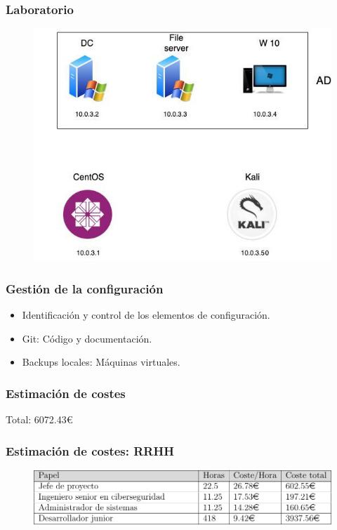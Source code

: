\documentclass[a4paper,10pt]{beamer}
\newcommand{\linej}{\hfill\break}
\begin{document}
\begin{frame}[fragile]
	\frametitle{Laboratorio}

	\begin{figure}[H]
		\centering
		\includegraphics[width=.8\textwidth]{../figuras/virtual_machines.jpg}
	\end{figure}
\end{frame}

\begin{frame}[fragile]
	\frametitle{Gestión de la configuración}

	\begin{itemize}
		\item Identificación y control de los elementos de configuración. %
		\item Git: Código y documentación.
		\item Backups locales: Máquinas virtuales.
	\end{itemize}
\end{frame}


\begin{frame}[fragile]
	\frametitle{Estimación de costes}

\begin{center}
\linej
Total: 6072.43\euro{}
\end{center}

\end{frame}


\begin{frame}[fragile]
	\frametitle{Estimación de costes: RRHH}

	\begin{figure}[H]
		\centering
		\includegraphics[width=.8\textwidth]{figuras/rrhh.png}
	\end{figure}
\end{frame}
\end{document}
